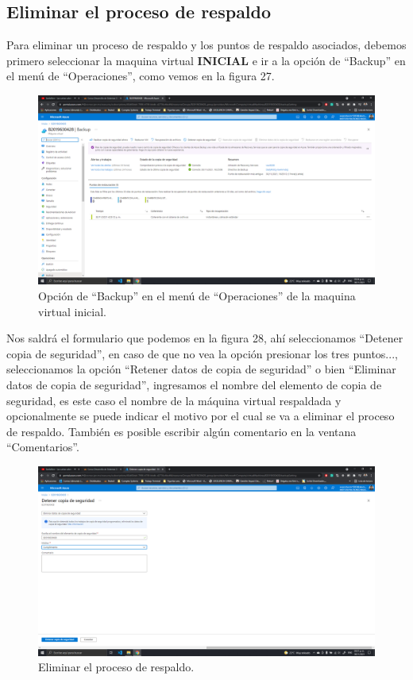 \documentclass[11pt]{article}
\begin{document}
		\subsection{Eliminar el proceso de respaldo}
		Para eliminar un proceso de respaldo y los puntos de respaldo asociados, debemos primero seleccionar la maquina virtual \textbf{INICIAL} e ir a la opción de ``Backup'' en el menú de ``Operaciones'', como vemos en la figura 27.
		\begin{figure}[H]
			\centering
			\includegraphics[scale=0.34]{resources/4.1-2.png}
			\caption{Opción de ``Backup'' en el menú de ``Operaciones'' de la maquina virtual inicial.}\label{fig:picture}
		\end{figure}
		Nos saldrá el formulario que podemos en la figura 28, ahí seleccionamos ``Detener copia de seguridad'', en caso de que no vea la opción presionar los tres puntos..., seleccionamos la opción ``Retener datos de copia de seguridad'' o bien ``Eliminar datos de copia de seguridad'', ingresamos el nombre del elemento de copia de seguridad, es este caso el nombre de la máquina virtual respaldada y opcionalmente se puede indicar el motivo por el cual se va a eliminar el proceso de respaldo. También es posible escribir algún comentario en la ventana ``Comentarios''.
		\begin{figure}[H]
			\centering
			\includegraphics[scale=0.34]{resources/4.3-6.png}
			\caption{Eliminar el proceso de respaldo.}\label{fig:picture}
		\end{figure}
\end{document}
